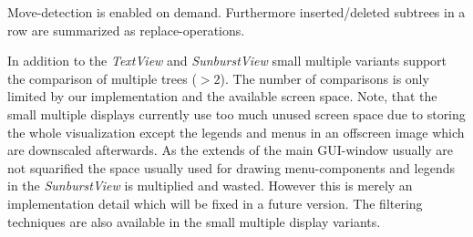 Move-detection is enabled on demand. Furthermore inserted/deleted subtrees in a row are summarized as replace-operations.

In addition to the \emph{TextView} and \emph{SunburstView} small multiple variants support the comparison of multiple trees ($>2$). The number of comparisons is only limited by our implementation and the available screen space. Note, that the small multiple displays currently use too much unused screen space due to storing the whole visualization except the legends and menus in an offscreen image which are downscaled afterwards. As the extends of the main GUI-window usually are not squarified the space usually used for drawing menu-components and legends in the \emph{SunburstView} is multiplied and wasted. However this is merely an implementation detail which will be fixed in a future version. The filtering techniques are also available in the small multiple display variants.
